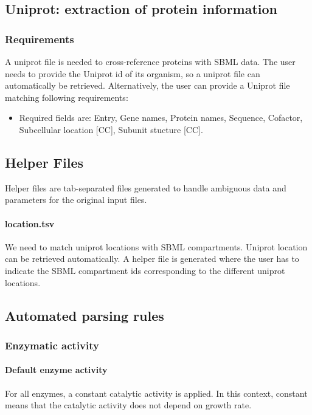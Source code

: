 \subsection{Uniprot: extraction of protein information}

\subsubsection{Requirements}

A uniprot file is needed to cross-reference proteins with SBML data. The user needs to provide the Uniprot id of its organism, so a uniprot file can automatically be retrieved. Alternatively, the user can provide a Uniprot file matching following requirements:
\begin{itemize}
\item Required fields are: Entry, Gene names, Protein names, Sequence, Cofactor, Subcellular location [CC], Subunit stucture [CC].
\end{itemize}

\subsection{Helper Files}

Helper files are tab-separated files generated to handle ambiguous data and parameters for the original input files.

\paragraph{location.tsv} We need to match uniprot locations with SBML compartments. Uniprot location can be retrieved automatically. A helper file is generated where the user has to indicate the SBML compartment ids corresponding to the different uniprot locations.

\subsection{Automated parsing rules}

\subsubsection{Enzymatic activity}
\paragraph{Default enzyme activity} For all enzymes, a constant catalytic activity is applied. In this context, constant means that the catalytic activity does not depend on growth rate.

